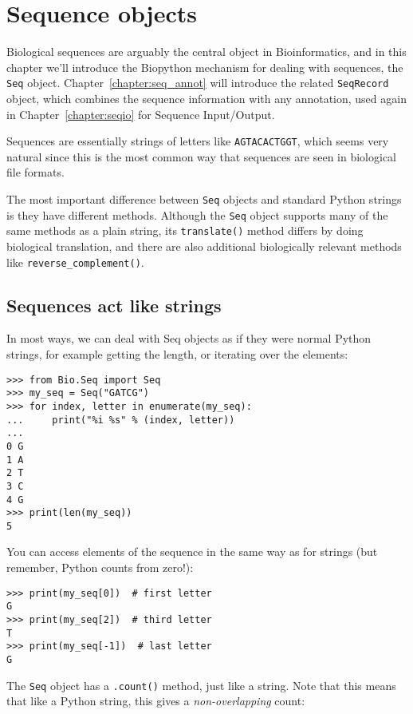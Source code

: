 \chapter{Sequence objects}
\label{chapter:seq_objects}

Biological sequences are arguably the central object in Bioinformatics, and in this chapter we'll introduce the Biopython mechanism for dealing with sequences, the \verb|Seq| object.
Chapter~\ref{chapter:seq_annot} will introduce the related \verb|SeqRecord| object, which combines the sequence information with any annotation, used again in Chapter~\ref{chapter:seqio} for Sequence Input/Output.

Sequences are essentially strings of letters like \verb|AGTACACTGGT|, which seems very natural since this is the most common way that sequences are seen in biological file formats.

The most important difference between \verb|Seq| objects and standard Python strings is they have different methods.
Although the \verb|Seq| object supports many of the same methods as a plain string, its \verb|translate()| method differs by doing biological translation, and there are also additional biologically relevant methods like \verb|reverse_complement()|.

\section{Sequences act like strings}

In most ways, we can deal with Seq objects as if they were normal Python strings, for example getting the length, or iterating over the elements:

\begin{verbatim}
>>> from Bio.Seq import Seq
>>> my_seq = Seq("GATCG")
>>> for index, letter in enumerate(my_seq):
...     print("%i %s" % (index, letter))
...
0 G
1 A
2 T
3 C
4 G
>>> print(len(my_seq))
5
\end{verbatim}

You can access elements of the sequence in the same way as for strings (but remember, Python counts from zero!):

\begin{verbatim}
>>> print(my_seq[0])  # first letter
G
>>> print(my_seq[2])  # third letter
T
>>> print(my_seq[-1])  # last letter
G
\end{verbatim}

The \verb|Seq| object has a \verb|.count()| method, just like a string.
Note that this means that like a Python string, this gives a
\emph{non-overlapping} count:

